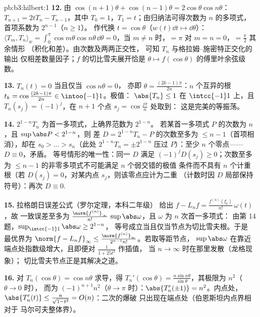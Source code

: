 \begin{solution}{pb:b3:hilbert:1}
\textbf{12.} 由 $\cos(n{+}1)\theta + \cos(n{-}1)\theta =
2\cos\theta\cos n\theta$：$T_{n+1} = 2tT_n - T_{n-1}$，其中
$T_0 = 1$，$T_1 = t$；由归纳法可得次数为
$n$ 的多项式，首项系数为 $2^{n-1}$（$n \geq 1$）。
作代换 $t = \cos\theta$（$w(t)\dd t \mapsto
\dd\theta$）：$\langle T_m, T_n\rangle_w =
\int_0^\pi\cos m\theta\cos n\theta\,\dd\theta = 0$，当 $m
\neq n$ 时，$= \pi$ 对 $m = n = 0$，$= \frac\pi2$ 其余情形
（积化和差）。由次数及两两正交性，
可知 $T_n$ 与格拉姆--施密特正交化的输出
仅相差数量因子；$f$ 的切比雪夫展开恰是
$\theta \mapsto f(\cos\theta)$ 的傅里叶余弦级数。

\textbf{13.} $T_n(t) = 0$ 当且仅当 $\cos n\theta = 0$，
亦即 $\theta = \frac{(2k-1)\pi}{2n}$：$n$ 个互异的根
$t_k = \cos\frac{(2k-1)\pi}{2n} \in \intoo{-1}1$。极值：
$\abs{T_n} \leq 1$ 在 $\intcc{-1}1$ 上，且 $T_n(s_j) =
(-1)^j$，在 $n + 1$ 个点 $s_j = \cos\frac{j\pi}n$ 处取到：
这是完美的等振荡。

\textbf{14.} $2^{1-n}T_n$ 为首一多项式，上确界范数为 $2^{1-n}$。
若某首一多项式 $P$ 的次数为 $n$，且 $\sup\abs P < 2^{1-n}$，则
差 $D = 2^{1-n}T_n - P$ 的次数至多为 $\leq n -
1$（首项相消），却在 $s_0 >
\dots > s_n$（此处 $2^{1-n}T_n = \pm2^{1-n}$ 压过
$P$）：至少 $n$ 个零点——$D \equiv 0$，矛盾。
等号情形的唯一性：同一 $D$ 满足
$(-1)^jD(s_j) \geq 0$；次数至多为 $\leq
n-1$ 的非零多项式不可能满足 $n$ 个弱交错的极值
条件而不具有 $n$ 个计重根（若
$D(s_j) = 0$，对某内点 $s_j$，则该零点应计为二重
（计数时因 $D$ 局部保持符号）：再次 $D
\equiv 0$.

\textbf{15.} 拉格朗日误差公式（罗尔定理，本科二年级）
给出 $f - L_nf = \frac{f^{(n)}(\xi_t)}{n!}\,\omega(t)$，故
一致误差至多为 $\frac{\norm{f^{(n)}}_\infty}
{n!}\,\sup\abs\omega$，且 $\omega$ 为 $n$ 次首一多项式：
由第 14 题，$\sup_{\intcc{-1}1}\abs\omega \geq 2^{1-n}$，
等号成立当且仅当节点为切比雪夫根。于是
最优界为 $\norm{f - L_nf}_\infty \leq
\frac{\norm{f^{(n)}}_\infty}{2^{n-1}n!}$。若取等距节点，
$\sup\abs\omega$ 在靠近
端点处指数级增大，且即便对 $\frac1{1 + 25t^2}$ 作插值，
当 $n \to \infty$ 时在那里发散（龙格现象）；
切比雪夫节点正是其解决之道。

\textbf{16.} 对 $T_n(\cos\theta) = \cos
n\theta$ 求导，得 $T_n'(\cos\theta) = \frac{n\sin n\theta}
{\sin\theta}$，其极限为 $n^2$（$\theta \to 0$ 时），
而为 $(-1)^{n+1}n^2$（$\theta \to \pi$ 时）：$\abs{T_n'(\pm1)} =
n^2$。内点处，$\abs{T_n'(t)} \leq
\frac{n}{\sqrt{1 - t^2}} = O(n)$：二次的爆破
只出现在端点处（伯恩斯坦内点界相对于
马尔可夫整体界）。


\end{solution}
